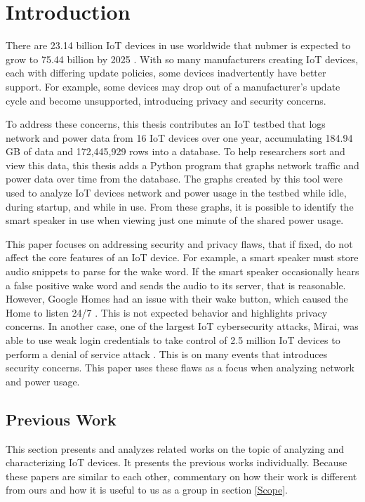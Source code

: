 \chapter{Introduction}
\label{Introduction}
There are 23.14 billion IoT devices in use worldwide that nubmer is expected to grow to 75.44 billion by 2025 \cite{statista_2016}. With so many manufacturers creating IoT devices, each with differing update policies, some devices inadvertently have better support. For example, some devices may drop out of a manufacturer's update cycle and become unsupported, introducing privacy and security concerns.

To address these concerns, this thesis contributes an IoT testbed that logs network and power data from 16 IoT devices over one year, accumulating 184.94 GB of data and 172,445,929 rows into a database. To help researchers sort and view this data, this thesis adds a Python program that graphs network traffic and power data over time from the database. The graphs created by this tool were used to analyze IoT devices network and power usage in the testbed while idle, during startup, and while in use. From these graphs, it is possible to identify the smart speaker in use when viewing just one minute of the shared power usage.

This paper focuses on addressing security and privacy flaws, that if fixed, do not affect the core features of an IoT device. For example, a smart speaker must store audio snippets to parse for the wake word. If the smart speaker occasionally hears a false positive wake word and sends the audio to its server, that is reasonable. However, Google Homes had an issue with their wake button, which caused the Home to listen 24/7 \cite{burke_2017}. This is not expected behavior and highlights privacy concerns. In another case, one of the largest IoT cybersecurity attacks, Mirai, was able to use weak login credentials to take control of 2.5 million IoT devices to perform a denial of service attack \cite{whittaker_2017}. This is on many events that introduces security concerns. This paper uses these flaws as a focus when analyzing network and power usage.

\section{Previous Work}
This section presents and analyzes related works on the topic of analyzing and characterizing IoT devices. It presents the previous works individually. Because these papers are similar to each other, commentary on how their work is different from ours and how it is useful to us as a group in section \ref{Scope}.

